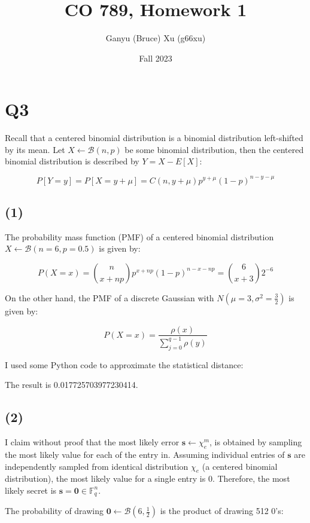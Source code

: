 \documentclass{article}
\title{CO 789, Homework 1}
\author{Ganyu (Bruce) Xu (g66xu)}
\date{Fall 2023}
\begin{document}

\section*{Q3}
Recall that a centered binomial distribution is a binomial distribution left-shifted by its mean. Let $X \leftarrow \mathcal{B}(n, p)$ be some binomial distribution, then the centered binomial distribution is described by $Y = X - E[X]$:

$$
P[Y=y] = P[X = y + \mu] = C(n, y + \mu)p^{y + \mu}(1-p)^{n - y - \mu}
$$

\subsection*{(1)}
The probability mass function (PMF) of a centered binomial distribution $X \leftarrow \mathcal{B}(n=6, p=0.5)$ is given by:

$$
P(X=x) = \binom{n}{x + np}p^{x + np}(1-p)^{n - x - np} = \binom{6}{x + 3}2^{-6}
$$

On the other hand, the PMF of a discrete Gaussian with $N(\mu=3, \sigma^2=\frac{3}{2})$ is given by:

$$
P(X=x) = \frac{\rho(x)}{\sum_{j=0}^{q-1}\rho(y)}
$$

I used some Python code to approximate the statistical distance:



The result is {0.017725703977230414}.

\subsection*{(2)}
I claim without proof that the most likely error $\mathbf{s} \leftarrow \chi_e^m$, is obtained by sampling the most likely value for each of the entry in. Assuming individual entries of $\mathbf{s}$ are independently sampled from identical distribution $\chi_e$ (a centered binomial distribution), the most likely value for a single entry is $0$. Therefore, the most likely secret is $\mathbf{s} = \mathbf{0} \in \mathbb{F}_q^n$.

The probability of drawing $\mathbf{0} \leftarrow \mathcal{B}(6, \frac{1}{2})$ is the product of drawing 512 $0$'s:
\end{document}

